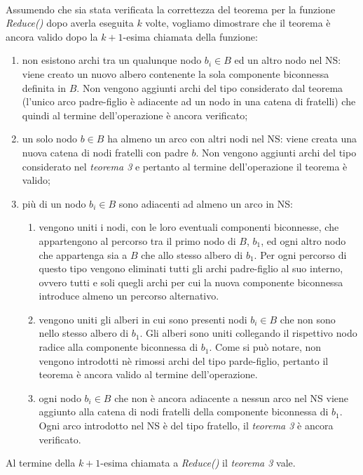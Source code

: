 \documentclass[a4paper,11pt]{report}
\begin{document}
\paragraph{}
Assumendo che sia stata verificata la correttezza del teorema per la funzione \emph{Reduce()} dopo averla eseguita $k$ volte, vogliamo
dimostrare che il teorema è ancora valido dopo la $k+1$-esima
chiamata della funzione:
\begin{enumerate}
 \item non esistono archi tra un qualunque nodo $b_i\in B$ ed un altro nodo nel NS: viene creato un nuovo albero contenente la sola
componente biconnessa definita in $B$. Non vengono aggiunti archi
del tipo considerato dal teorema (l'unico arco padre-figlio è adiacente ad un nodo in una catena di fratelli) che quindi al termine
dell'operazione è ancora verificato;
 \item un solo nodo $b\in B$ ha almeno un arco con altri nodi nel NS: viene creata una nuova catena di nodi fratelli con padre $b$. Non
vengono aggiunti archi del tipo considerato nel 
\emph{teorema 3} e pertanto al termine dell'operazione il teorema è valido;
 \item più di un nodo $b_i\in B$ sono adiacenti ad almeno un arco in NS: 
  \begin{enumerate}
   \item vengono uniti i nodi, con le loro eventuali componenti biconnesse, che appartengono al percorso tra il primo nodo di $B$, $b_1$, ed
ogni altro nodo che appartenga sia a $B$ che allo
stesso albero di $b_1$. Per ogni percorso di questo tipo vengono eliminati tutti gli archi padre-figlio al suo interno, ovvero tutti e soli
quegli archi per cui la nuova componente biconnessa
introduce almeno un percorso alternativo.
  \item vengono uniti gli alberi in cui sono presenti nodi $b_i\in B$ che non sono nello stesso albero di $b_1$. Gli alberi sono uniti
collegando il rispettivo nodo radice alla 
componente biconnessa di $b_1$. Come si può notare, non vengono introdotti nè rimossi archi del tipo parde-figlio, pertanto il teorema è
ancora valido al termine dell'operazione.
  \item ogni nodo $b_i\in B$ che non è ancora adiacente a nessun arco nel NS viene aggiunto alla catena di nodi fratelli della componente
biconnessa di $b_1$. Ogni arco introdotto
nel NS è del tipo fratello, il \emph{teorema 3} è ancora verificato.
  \end{enumerate}
\end{enumerate}
Al termine della $k+1$-esima chiamata a \emph{Reduce()} il \emph{teorema 3} vale.
\end{document}
